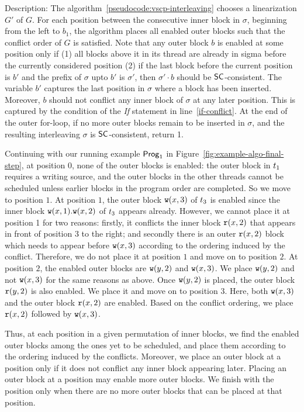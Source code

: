 Description: The algorithm~\ref{pseudocode:vscp-interleaving} chooses a linearization $G'$ of $G$. For each position between the consecutive inner block in $\sigma$, beginning from the left to $b_1$, the algorithm places all enabled outer blocks such that the conflict order of $G$ is satisfied. Note that any outer  block $b$ is enabled at some position only if (1) all blocks above it in its thread are already in sigma before the currently considered position (2) if the last block before the current position is $b'$ and the prefix of $\sigma$ upto $b'$ is $\sigma'$, then $\sigma'\cdot b$ should be $\mathsf{SC}$-consistent. The variable $b'$ captures the last position in $\sigma$ where a block has been inserted. Moreover, $b$ should not conflict any inner block of $\sigma$ at any later position. This is captured by the condition of the \emph{If} statement in line~\ref{if-conflict}. At the end of the outer for-loop, if no more outer blocks remain to be inserted in $\sigma$, and the resulting interleaving $\sigma$ is $\mathsf{SC}$-consistent, return 1.

Continuing with our running example $\mathsf{Prog}_1$ in Figure~\ref{fig:example-algo-final-step}, at position $0$, none of the outer blocks is enabled: the outer block in $t_1$ requires a writing source, and the outer blocks in the other threads cannot be scheduled unless earlier blocks in the program order are completed. So we move to position $1$. At position $1$, the outer block $\mathtt{w}(x, 3)$ of $t_3$ is enabled since the inner block $\mathtt{w}(x,1).\mathtt{w}(x,2)$ of $t_3$ 
appears already.  However, we cannot place it at position 1 for two reasons: firstly, it conflicts the inner block $\mathtt{r}(x, 2)$ that appears in front of position 3 to the right; and secondly there is an outer $\mathtt{r}(x,2)$ block which needs to appear before $\mathtt{w}(x, 3)$ according to the ordering induced by the conflict. Therefore, we do not place it at position $1$ and move on to position $2$. At position $2$, the enabled outer blocks are $\mathtt{w}(y, 2)$ and $\mathtt{w}(x, 3)$. We place $\mathtt{w}(y, 2)$ and not $\mathtt{w}(x, 3)$ for the same reasons as above. Once $\mathtt{w}(y, 2)$ is placed, the outer block $\mathtt{r}(y, 2)$ is also enabled. We place it and move on to position $3$. Here, both $\mathtt{w}(x, 3)$ and the outer block $\mathtt{r}(x, 2)$ are enabled. Based on the conflict ordering, we place $\mathtt{r}(x, 2)$ followed by $\mathtt{w}(x, 3)$. 

Thus, at each position in a given permutation of inner blocks,
 we find the enabled outer blocks among the ones yet to be scheduled, and  place them according to the ordering induced by the conflicts. Moreover, we place an outer block at a position only if it does not conflict any inner block appearing later. Placing an outer block at a position may enable more outer blocks. We finish with the position only when there are no more outer blocks that can be placed at that position.  
 
